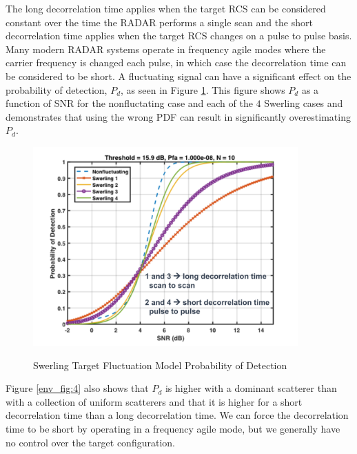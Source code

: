 \renewcommand{\baselinestretch}{2} \small\normalsize

The long decorrelation time applies when the target RCS can be considered constant over the time the RADAR performs a single scan and the short decorrelation time applies when the target RCS changes on a pulse to pulse basis. Many modern RADAR systems operate in frequency agile modes where the carrier frequency is changed each pulse, in which case the decorrelation time can be considered to be short. A fluctuating signal can have a significant effect on the probability of detection, $P_d$, as seen in Figure \ref{env_fig:5}. This figure shows $P_d$ as a function of SNR for the nonfluctating case and each of the $4$ Swerling cases and demonstrates that using the wrong PDF can result in significantly overestimating $P_d$.
\begin{figure}[H]
  \begin{center}
\includegraphics[width=4in]{../media/multistatic/swerling_pd.png}
  \end{center}
  \renewcommand{\baselinestretch}{1} \small\normalsize
  \begin{quote}
    \caption[Swerling Target Fluctuation Model Probability of Detection]{Swerling Target Fluctuation Model Probability of Detection\label{env_fig:5}}
  \end{quote}
\end{figure}
\renewcommand{\baselinestretch}{2} \small\normalsize

Figure \ref{env_fig:4} also shows that $P_d$ is higher with a dominant scatterer than with a collection of uniform scatterers and that it is higher for a short decorrelation time than a long decorrelation time. We can force the decorrelation time to be short by operating in a frequency agile mode, but we generally have no control over the target configuration.


